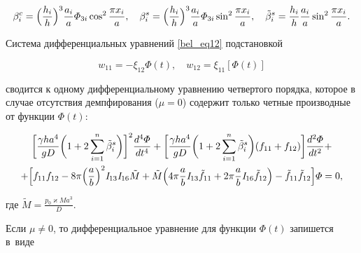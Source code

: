 \begin{equation*}

\beta_i^c=\Bigl( \frac{h_i}{h}\Bigr) ^3\frac{a_i}{a}\varPhi_{3i}\cos^2 \frac{\pi x_i}{a},

\quad 

\beta_i^s=\Bigl( \frac{h_i}{h}\Bigr) ^3\frac{a_i}{a}\varPhi_{3i}\sin^2 \frac{\pi x_i}{a},

\quad 

\tilde{\beta}_i^s= \frac{h_i}{h}\frac{a_i}{a}\sin^2 \frac{\pi x_i}{a}.

\end{equation*}



Система дифференциальных уравнений \eqref{bel_eq12} подстановкой 

\begin{equation*}

w_{11}=-\xi_{12}\varPhi(t), \quad w_{12}=\xi_{11}\left[\varPhi(t) \right] 

\end{equation*}

сводится к одному дифференциальному уравнению четвертого порядка, которое в случае отсутствия  демпфирования ($\mu=0$) содержит только четные производные от функции $\varPhi(t)$:

\begin{multline}\label{bel_eq15}

\biggl[ 

\frac{\gamma h a^4}{g D}\biggl( 1+2\sum\limits_{i=1}^n \tilde{\beta}_i^s\biggr) \biggr]^2

\frac{d^4\varPhi}{dt^4} +

\biggl[ \frac{\gamma h a^4}{g D}\biggl( 1+2\sum\limits_{i=1}^n \tilde{\beta}_i^s\biggr)

( f_{11}+f_{12})  \biggr]\frac{d^2\varPhi}{dt^2}+

\\

+\Bigl[ f_{11}f_{12}-8\pi \Bigl( \frac{a}{b}\Bigr)^2\mathit{I}_{13}\mathit{I}_{16}\tilde{M}+\tilde{M} 

\Bigl(4 \pi \frac{a}{b}\mathit{I}_{13}\tilde{f}_{11}+2 \pi \frac{a}{b}\mathit{I}_{16}\tilde{f}_{12} \Bigr) - \tilde{f}_{11}\tilde{f}_{12}\Bigr] \varPhi=0,

\end{multline}

где $\tilde{M}=\frac{p_0 \varkappa M a^3}{D}$.



Если $\mu\neq0$, то дифференциальное уравнение для функции $\varPhi(t)$ запишется в~виде

